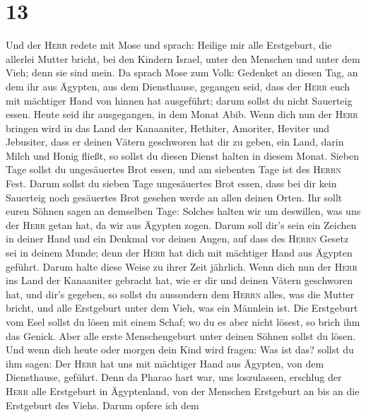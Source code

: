 \hypertarget{section-12}{%
\section{13}\label{section-12}}

 Und der \textsc{Herr} redete mit Mose und sprach:
 Heilige mir alle Erstgeburt, die allerlei Mutter bricht,
bei den Kindern Israel, unter den Menschen und unter dem Vieh; denn sie
sind mein.  Da sprach Mose zum Volk: Gedenket an diesen
Tag, an dem ihr aus Ägypten, aus dem Diensthause, gegangen seid, dass
der \textsc{Herr} euch mit mächtiger Hand von hinnen hat ausgeführt;
darum sollst du nicht Sauerteig essen.  Heute seid ihr
ausgegangen, in dem Monat Abib.  Wenn dich nun der
\textsc{Herr} bringen wird in das Land der Kanaaniter, Hethiter,
Amoriter, Heviter und Jebusiter, dass er deinen Vätern geschworen hat
dir zu geben, ein Land, darin Milch und Honig fließt, so sollst du
diesen Dienst halten in diesem Monat.  Sieben Tage sollst
du ungesäuertes Brot essen, und am siebenten Tage ist des \textsc{Herrn}
Fest.  Darum sollst du sieben Tage ungesäuertes Brot
essen, dass bei dir kein Sauerteig noch gesäuertes Brot gesehen werde an
allen deinen Orten.  Ihr sollt euren Söhnen sagen an
demselben Tage: Solches halten wir um deswillen, was uns der
\textsc{Herr} getan hat, da wir aus Ägypten zogen.  Darum
soll dir's sein ein Zeichen in deiner Hand und ein Denkmal vor deinen
Augen, auf dass des \textsc{Herrn} Gesetz sei in deinem Munde; denn der
\textsc{Herr} hat dich mit mächtiger Hand aus Ägypten geführt.
 Darum halte diese Weise zu ihrer Zeit jährlich.
 Wenn dich nun der \textsc{Herr} ins Land der Kanaaniter
gebracht hat, wie er dir und deinen Vätern geschworen hat, und dir's
gegeben,  so sollst du aussondern dem \textsc{Herrn}
alles, was die Mutter bricht, und alle Erstgeburt unter dem Vieh, was
ein Männlein ist.  Die Erstgeburt vom Esel sollst du
lösen mit einem Schaf; wo du es aber nicht lösest, so brich ihm das
Genick. Aber alle erste Menschengeburt unter deinen Söhnen sollst du
lösen.  Und wenn dich heute oder morgen dein Kind wird
fragen: Was ist das? sollst du ihm sagen: Der \textsc{Herr} hat uns mit
mächtiger Hand aus Ägypten, von dem Diensthause, geführt.
 Denn da Pharao hart war, uns loszulassen, erschlug der
\textsc{Herr} alle Erstgeburt in Ägyptenland, von der Menschen
Erstgeburt an bis an die Erstgeburt des Viehs. Darum opfere ich dem
